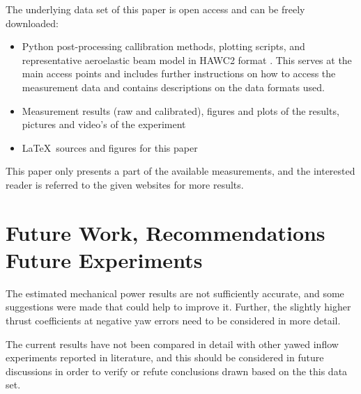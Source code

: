 \documentclass[a4paper]{jpconf}
\begin{document}
The underlying data set of this paper is open access and can be freely downloaded:
\begin{itemize}
	\item Python post-processing callibration methods, plotting scripts, and representative aeroelastic beam model in HAWC2 format \cite{github:freeyaw-ojf-wt-tests}. This serves at the main access points and includes further instructions on how to access the measurement data and contains descriptions on the data formats used.
	\item Measurement results (raw and calibrated), figures and plots of the results, pictures and video's of the experiment \cite{deic:data-sources}
	\item \LaTeX \ sources and figures for this paper \cite{github:torque2016-freeyaw-measurements}
\end{itemize}

This paper only presents a part of the available measurements, and the interested reader is referred to the given websites for more results.



\section{Future Work, Recommendations Future Experiments}

The estimated mechanical power results are not sufficiently accurate, and some suggestions were made that could help to improve it. Further, the slightly higher thrust coefficients at negative yaw errors need to be considered in more detail.

The current results have not been compared in detail with other yawed inflow experiments reported in literature, and this should be considered in future discussions in order to verify or refute conclusions drawn based on the this data set.
\end{document}
